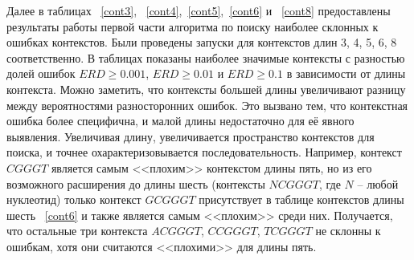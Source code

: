 	Далее в таблицах ~\ref{cont3}, ~\ref{cont4},~\ref{cont5},~\ref{cont6} и ~\ref{cont8} предоставлены результаты работы первой части алгоритма по поиску наиболее склонных к ошибках контекстов. Были проведены запуски для контекстов длин 3, 4, 5, 6, 8 соответственно. В таблицах показаны наиболее значимые контексты с разностью долей ошибок $ERD \ge 0.001$, $ERD \ge 0.01$ и $ERD \ge 0.1$ в зависимости от длины контекста. Можно заметить, что контексты большей длины увеличивают разницу между вероятностями разносторонних ошибок. Это вызвано тем, что контекстная ошибка более специфична, и малой длины недостаточно для её явного выявления. Увеличивая длину, увеличивается пространство контекстов для поиска, и точнее охарактеризовывается последовательность.  Например, контекст $CGGGT$ является самым <<плохим>> контекстом длины пять, но из его возможного расширения до длины шесть (контексты $NCGGGT$, где $N$ -- любой нуклеотид) только контекст $GCGGGT$ присутствует в таблице контекстов длины шесть ~\ref{cont6} и также является самым <<плохим>> среди них. Получается, что остальные три контекста $ACGGGT$, $CCGGGT$, $TCGGGT$ не склонны к ошибкам, хотя они считаются <<плохими>> для длины пять.

\begin{table}[H]
\begin{center}
\end{center}
\captionsetup{justification=centering}
\caption{Статистика для контекстов длины три.}
\label{cont3}
\end{table} 

